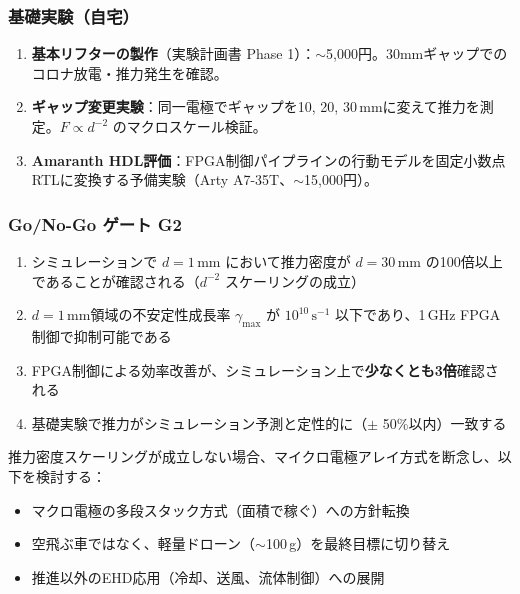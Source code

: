 \documentclass[12pt,a4paper]{ltjsarticle}
\begin{document}
\subsubsection{基礎実験（自宅）}

\begin{enumerate}[leftmargin=2em]
  \item \textbf{基本リフターの製作}（実験計画書 Phase 1）：$\sim$5,000円。30mmギャップでのコロナ放電・推力発生を確認。
  \item \textbf{ギャップ変更実験}：同一電極でギャップを10, 20, 30\,mmに変えて推力を測定。$F \propto d^{-2}$ のマクロスケール検証。
  \item \textbf{Amaranth HDL評価}：FPGA制御パイプラインの行動モデルを固定小数点RTLに変換する予備実験（Arty A7-35T、$\sim$15,000円）。
\end{enumerate}

\subsubsection{Go/No-Go ゲート G2}

\begin{successbox}[G2通過条件]
\begin{enumerate}[leftmargin=2em]
  \item シミュレーションで $d = 1$\,mm において推力密度が $d = 30$\,mm の100倍以上であることが確認される（$d^{-2}$ スケーリングの成立）
  \item $d = 1$\,mm領域の不安定性成長率 $\gamma_{\max}$ が $10^{10}\,\mathrm{s}^{-1}$ 以下であり、1\,GHz FPGA制御で抑制可能である
  \item FPGA制御による効率改善が、シミュレーション上で\textbf{少なくとも3倍}確認される
  \item 基礎実験で推力がシミュレーション予測と定性的に（$\pm$ 50\%以内）一致する
\end{enumerate}
\end{successbox}

\begin{warningbox}[G2でNoの場合]
推力密度スケーリングが成立しない場合、マイクロ電極アレイ方式を断念し、以下を検討する：
\begin{itemize}[leftmargin=2em]
  \item マクロ電極の多段スタック方式（面積で稼ぐ）への方針転換
  \item 空飛ぶ車ではなく、軽量ドローン（$\sim$100\,g）を最終目標に切り替え
  \item 推進以外のEHD応用（冷却、送風、流体制御）への展開
\end{itemize}
\end{warningbox}
\end{document}

